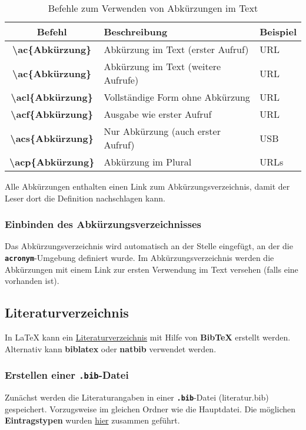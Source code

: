 \begin{table}[H]
  \centering
  \begin{tabular}{>{\bfseries}cll}
    \toprule
    \textbf{Befehl}                 & \textbf{Beschreibung}               & \textbf{Beispiel} \\
    \midrule
    \textbackslash ac\{Abkürzung\}  & Abkürzung im Text (erster Aufruf)   & \ac{URL}          \\
    \textbackslash ac\{Abkürzung\}  & Abkürzung im Text (weitere Aufrufe) & \ac{URL}          \\
    \textbackslash acl\{Abkürzung\} & Vollständige Form ohne Abkürzung    & \acl{URL}         \\
    \textbackslash acf\{Abkürzung\} & Ausgabe wie erster Aufruf           & \acf{URL}         \\
    \textbackslash acs\{Abkürzung\} & Nur Abkürzung (auch erster Aufruf)  & \acs{USB}         \\
    \textbackslash acp\{Abkürzung\} & Abkürzung im Plural                 & \acp{URL}         \\
    \bottomrule
  \end{tabular}
  \caption{Befehle zum Verwenden von Abkürzungen im Text}
  \label{tab:acronyms_usage}
\end{table}

Alle Abkürzungen enthalten einen Link zum Abkürzungsverzeichnis, damit der Leser dort die Definition nachschlagen kann.

\subsubsection{Einbinden des Abkürzungsverzeichnisses}
Das Abkürzungsverzeichnis wird automatisch an der Stelle eingefügt, an der die \texttt{\textbf{acronym}}-Umgebung definiert wurde. Im Abkürzungsverzeichnis werden die Abkürzungen mit einem Link zur ersten Verwendung im Text versehen (falls eine vorhanden ist).


\subsection{Literaturverzeichnis}
\label{sec:literaturverzeichnis_erklärung}
In \LaTeX{} kann ein \hyperref[sec:literaturverzeichnis]{Literaturverzeichnis} mit Hilfe von \textbf{BibTeX} erstellt werden.
Alternativ kann \textbf{biblatex} oder \textbf{natbib} verwendet werden.

\subsubsection{Erstellen einer \textbf{\texttt{.bib}}-Datei}
Zunächst werden die Literaturangaben in einer \textbf{\texttt{.bib}}-Datei (literatur.bib) gespeichert. Vorzugsweise im gleichen Ordner wie die Hauptdatei.
Die möglichen \textbf{Eintragstypen} wurden \href{https://www.overleaf.com/learn/latex/Bibliography_management_with_bibtex#Taking_another_look_at_.bib_files}{hier} zusammen geführt.

